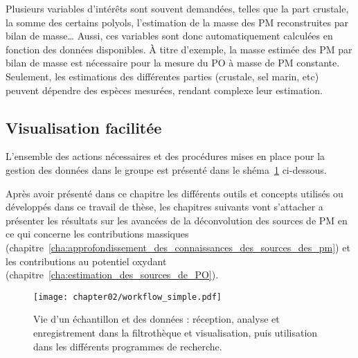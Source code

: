 Plusieurs variables d'intérêts sont souvent demandées, telles que la part crustale, la
somme des certains polyols, l'estimation de la masse des PM reconstruites par bilan de
masse… Aussi, ces variables sont donc automatiquement calculées en fonction des données
disponibles. À titre d'exemple, la masse estimée des PM par bilan de masse est nécessaire
pour la mesure du PO à masse de PM constante. Seulement, les estimations des différentes
parties (crustale, sel marin, etc) peuvent dépendre des espèces mesurées, rendant complexe
leur estimation.

\subsection{Visualisation facilitée}%
\label{sub:visualisation_facilité}

L'ensemble des actions nécessaires et des procédures mises en place pour la gestion des
données dans le groupe est présenté dans le shéma~\ref{fig:bdd} ci-dessous.



Après avoir présenté dans ce chapitre les différents outils et concepts utilisés ou
développés dans ce travail de thèse, les chapitres suivants vont s'attacher a présenter
les résultats sur les avancées de la déconvolution des sources de PM en ce qui concerne
les contributions massiques
(chapitre~\ref{cha:approfondissement_des_connaissances_des_sources_des_pm}) et les
contributions au potentiel oxydant (chapitre~\ref{cha:estimation_des_sources_de_PO}).

\begin{landscape}
\begin{figure}[ht]
    \centering
    \texttt{[image: chapter02/workflow\_simple.pdf]}
    \caption{Vie d'un échantillon et des données : réception, analyse et enregistrement
        dans la filtrothèque et visualisation, puis utilisation dans les différents
        programmes de recherche.}%
    \label{fig:bdd}
\end{figure}
\end{landscape}



